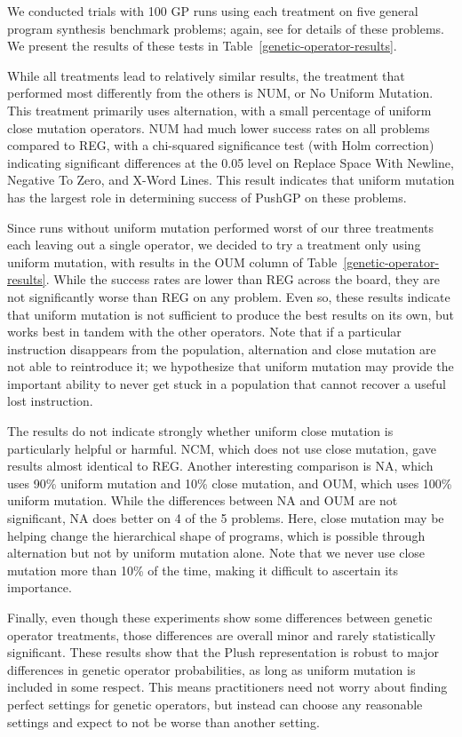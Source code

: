 \documentclass[graybox]{svmult}
\begin{document}
We conducted trials with 100 GP runs using each treatment on five general program synthesis benchmark problems; again, see \cite{Helmuth:2015:GECCO} for details of these problems. We present the results of these tests in Table~\ref{genetic-operator-results}.

While all treatments lead to relatively similar results, the treatment that performed most differently from the others is NUM, or No Uniform Mutation. This treatment primarily uses alternation, with a small percentage of uniform close mutation operators. NUM had much lower success rates on all problems compared to REG, with a chi-squared significance test (with Holm correction) indicating significant differences at the 0.05 level on Replace Space With Newline, Negative To Zero, and X-Word Lines. This result indicates that uniform mutation has the largest role in determining success of PushGP on these problems.

Since runs without uniform mutation performed worst of our three treatments each leaving out a single operator, we decided to try a treatment only using uniform mutation, with results in the OUM column of Table~\ref{genetic-operator-results}. While the success rates are lower than REG across the board, they are not significantly worse than REG on any problem. Even so, these results indicate that uniform mutation is not sufficient to produce the best results on its own, but works best in tandem with the other operators. Note that if a particular instruction disappears from the population, alternation and close mutation are not able to reintroduce it; we hypothesize that uniform mutation may provide the important ability to never get stuck in a population that cannot recover a useful lost instruction.

The results do not indicate strongly whether uniform close mutation is particularly helpful or harmful. NCM, which does not use close mutation, gave results almost identical to REG. Another interesting comparison is NA, which uses 90\% uniform mutation and 10\% close mutation, and OUM, which uses 100\% uniform mutation. While the differences between NA and OUM are not significant, NA does better on 4 of the 5 problems. Here, close mutation may be helping change the hierarchical shape of programs, which is possible through alternation but not by uniform mutation alone. Note that we never use close mutation more than 10\% of the time, making it difficult to ascertain its importance.

Finally, even though these experiments show some differences between genetic operator treatments, those differences are overall minor and rarely statistically significant. These results show that the Plush representation is robust to major differences in genetic operator probabilities, as long as uniform mutation is included in some respect. This means practitioners need not worry about finding perfect settings for genetic operators, but instead can choose any reasonable settings and expect to not be worse than another setting.
\end{document}
